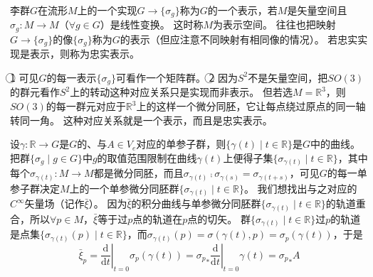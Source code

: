 \begin{definition}
    李群$G$在流形$M$上的一个实现$G \to \{\sigma_g\}$称为$G$的一个表示，若$M$是矢量空间且$\sigma_g \colon M \to M$（$\forall g \in G$）是线性变换。
    这时称$M$为表示空间。
    往往也把映射$G \to \{\sigma_g\}$的像$\{\sigma_g\}$称为$G$的表示（但应注意不同映射有相同像的情况）。
    若忠实实现是表示，则称为忠实表示。
\end{definition}

\begin{note}
    \textcircled{1} 可见$G$的每一表示$\{\sigma_g\}$可看作一个矩阵群。
    \textcircled{2} 因为$S^2$不是矢量空间，把$SO(3)$的群元看作$S^2$上的转动这种对应关系只是实现而非表示。
    但若选$M = \mathbb{R}^3$，则$SO(3)$的每一群元对应于$\mathbb{R}^3$上的这样一个微分同胚，它让每点绕过原点的同一轴转同一角。
    这种对应关系就是一个表示，而且是忠实表示。
\end{note}

设$\gamma \colon \mathbb{R} \to G$是$G$的、与$A \in V_e$对应的单参子群，则$\{\gamma(t) \mid t \in \mathbb{R}\}$是$G$中的曲线。
把群$\{\sigma_g \mid g \in G\}$中$g$的取值范围限制在曲线$\gamma(t)$上便得子集$\{\sigma_{\gamma(t)} \mid t \in \mathbb{R}\}$，其中每个$\sigma_{\gamma(t)} \colon M \to M$都是微分同胚，而且$\sigma_{\gamma(t)} \comp \sigma_{\gamma(s)} = \sigma_{\gamma(t + s)}$，可见$G$的每一单参子群决定$M$上的一个单参微分同胚群$\{\sigma_{\gamma(t)} \mid t \in \mathbb{R}\}$。
我们想找出与之对应的$C^\infty$矢量场（记作$\bar\xi$）。
因为$\bar\xi$的积分曲线与单参微分同胚群$\{\sigma_{\gamma(t)} \mid t \in \mathbb{R}\}$的轨道重合，所以$\forall p \in M$，$\bar\xi$等于过$p$点的轨道在$p$点的切矢。
群$\{\sigma_{\gamma(t)} \mid t \in \mathbb{R}\}$过$p$的轨道是点集$\{\sigma_{\gamma(t)}(p) \mid t \in \mathbb{R}\}$，而$\sigma_{\gamma(t)}(p) = \sigma(\gamma(t), p) = \sigma_p(\gamma(t))$，于是
$$\bar\xi_p = \left.\frac{\mathrm{d}}{\mathrm{d}t}\right|_{t = 0}\sigma_p(\gamma(t)) = {\sigma_p}_*\left.\frac{\mathrm{d}}{\mathrm{d}t}\right|_{t = 0}\gamma(t) = {\sigma_p}_*A$$


